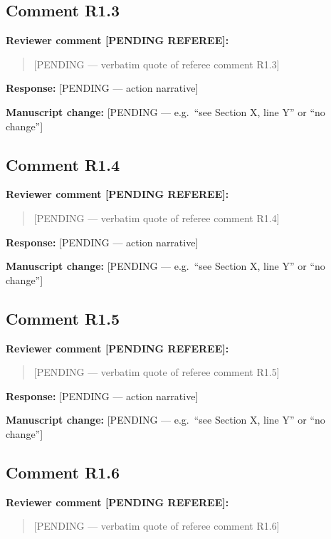\documentclass[11pt]{amsart}
\begin{document}
\subsection*{Comment R1.3}
\noindent\textbf{Reviewer comment [PENDING REFEREE]:}
\begin{quote}
[PENDING --- verbatim quote of referee comment R1.3]
\end{quote}

\noindent\textbf{Response:} [PENDING --- action narrative]

\noindent\textbf{Manuscript change:} [PENDING --- e.g.\ ``see Section X, line Y'' or ``no change'']

\bigskip

\subsection*{Comment R1.4}
\noindent\textbf{Reviewer comment [PENDING REFEREE]:}
\begin{quote}
[PENDING --- verbatim quote of referee comment R1.4]
\end{quote}

\noindent\textbf{Response:} [PENDING --- action narrative]

\noindent\textbf{Manuscript change:} [PENDING --- e.g.\ ``see Section X, line Y'' or ``no change'']

\bigskip

\subsection*{Comment R1.5}
\noindent\textbf{Reviewer comment [PENDING REFEREE]:}
\begin{quote}
[PENDING --- verbatim quote of referee comment R1.5]
\end{quote}

\noindent\textbf{Response:} [PENDING --- action narrative]

\noindent\textbf{Manuscript change:} [PENDING --- e.g.\ ``see Section X, line Y'' or ``no change'']

\bigskip

\subsection*{Comment R1.6}
\noindent\textbf{Reviewer comment [PENDING REFEREE]:}
\begin{quote}
[PENDING --- verbatim quote of referee comment R1.6]
\end{quote}
\end{document}
